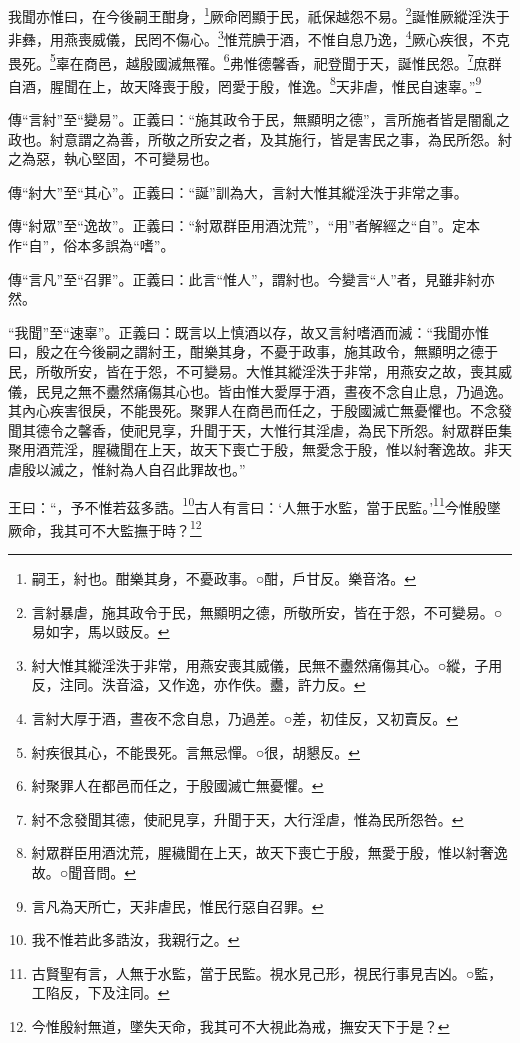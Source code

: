 我聞亦惟曰，在今後嗣王酣身，\footnote{嗣王，紂也。酣樂其身，不憂政事。○酣，戶甘反。樂音洛。}厥命罔顯于民，祇保越怨不易。\footnote{言紂暴虐，施其政令于民，無顯明之德，所敬所安，皆在于怨，不可變易。○易如字，馬以豉反。}誕惟厥縱淫泆于非彝，用燕喪威儀，民罔不傷心。\footnote{紂大惟其縱淫泆于非常，用燕安喪其威儀，民無不衋然痛傷其心。○縱，子用反，注同。泆音溢，又作逸，亦作佚。衋，許力反。}惟荒腆于酒，不惟自息乃逸，\footnote{言紂大厚于酒，晝夜不念自息，乃過差。○差，初佳反，又初賣反。}厥心疾很，不克畏死。\footnote{紂疾很其心，不能畏死。言無忌憚。○很，胡懇反。}辜在商邑，越殷國滅無罹。\footnote{紂聚罪人在都邑而任之，于殷國滅亡無憂懼。}弗惟德馨香，祀登聞于天，誕惟民怨。\footnote{紂不念發聞其德，使祀見享，升聞于天，大行淫虐，惟為民所怨咎。}庶群自酒，腥聞在上，故天降喪于殷，罔愛于殷，惟逸。\footnote{紂眾群臣用酒沈荒，腥穢聞在上天，故天下喪亡于殷，無愛于殷，惟以紂奢逸故。○聞音問。}天非虐，惟民自速辜。”\footnote{言凡為天所亡，天非虐民，惟民行惡自召罪。}


{\noindent\zhuan{}\fzbyks 傳“言紂”至“變易”。正義曰：“施其政令于民，無顯明之德”，言所施者皆是闇亂之政也。紂意謂之為善，所敬之所安之者，及其施行，皆是害民之事，為民所怨。紂之為惡，執心堅固，不可變易也。 \par}

{\noindent\zhuan{}\fzbyks 傳“紂大”至“其心”。正義曰：“誕”訓為大，言紂大惟其縱淫泆于非常之事。 \par}

{\noindent\zhuan{}\fzbyks 傳“紂眾”至“逸故”。正義曰：“紂眾群臣用酒沈荒”，“用”者解經之“自”。定本作“自”，俗本多誤為“嗜”。 \par}

{\noindent\zhuan{}\fzbyks 傳“言凡”至“召罪”。正義曰：此言“惟人”，謂紂也。今變言“人”者，見雖非紂亦然。 \par}

{\noindent\shu{}\fzkt “我聞”至“速辜”。正義曰：既言以上慎酒以存，故又言紂嗜酒而滅：“我聞亦惟曰，殷之在今後嗣之謂紂王，酣樂其身，不憂于政事，施其政令，無顯明之德于民，所敬所安，皆在于怨，不可變易。大惟其縱淫泆于非常，用燕安之故，喪其威儀，民見之無不衋然痛傷其心也。皆由惟大愛厚于酒，晝夜不念自止息，乃過逸。其內心疾害很戾，不能畏死。聚罪人在商邑而任之，于殷國滅亡無憂懼也。不念發聞其德令之馨香，使祀見享，升聞于天，大惟行其淫虐，為民下所怨。紂眾群臣集聚用酒荒淫，腥穢聞在上天，故天下喪亡于殷，無愛念于殷，惟以紂奢逸故。非天虐殷以滅之，惟紂為人自召此罪故也。” \par}

王曰：“，予不惟若茲多誥。\footnote{我不惟若此多誥汝，我親行之。}古人有言曰：‘人無于水監，當于民監。’\footnote{古賢聖有言，人無于水監，當于民監。視水見己形，視民行事見吉凶。○監，工陷反，下及注同。}今惟殷墜厥命，我其可不大監撫于時？\footnote{今惟殷紂無道，墜失天命，我其可不大視此為戒，撫安天下于是？}

